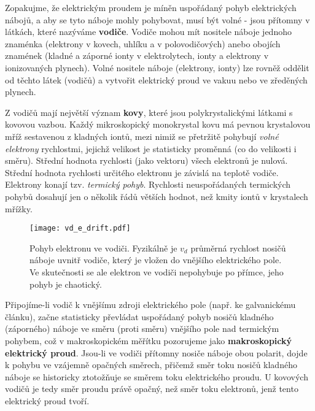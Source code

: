       Zopakujme, že elektrickým proudem je míněn uspořádaný pohyb elektrických ná\-bo\-jů, a aby se
      tyto náboje mohly pohybovat, musí být volné - jsou přítomny v látkách, které nazýváme
      \textbf{vodiče}. Vodiče mohou mít nositele náboje jednoho znaménka (elektrony v kovech,
      uhlíku a v polovodičových) anebo obojích znamének (kladné a záporné ionty v elektrolytech,
      ionty a elektrony v ionizovaných plynech). Volné nositele náboje (elektrony, ionty) lze
      rovněž oddělit od těchto látek (vodičů) a vytvořit elektrický proud ve vakuu nebo ve
      zředěných plynech.
      
      Z vodičů mají největší význam \textbf{kovy}, které jsou polykrystalickými látkami s kovovou
      vazbou. Každý mikroskopický monokrystal kovu má pevnou krystalovou mříž sestavenou z kladných
      iontů, mezi nimiž se přetržitě pohybují \emph{volné elektrony} rychlost\-mi, jejichž velikost
      je statisticky proměnná (co do velikosti i směru). Střední hodnota rychlosti (jako vektoru)
      všech elektronů je nulová. Střední hodnota rychlosti určitého elektronu je závislá na teplotě
      vodiče. Elektrony konají tzv. \emph{termický pohyb}. Rychlosti neuspořádaných termických
      pohybů dosahují jen o několik řádů větších hodnot, než kmity iontů v krystalech mřížky.

      \begin{figure}
        \centering
        \texttt{[image: vd\_e\_drift.pdf]}
        \caption[Pohyb elektronu ve vodiči.]{Pohyb elektronu ve vodiči. Fyzikálně je $v_d$ 
                 průměrná rychlost nosičů náboje uvnitř vodiče, který je vložen do vnějšího
                 elektrického pole. Ve skutečnosti se ale elektron ve vodiči nepohybuje po přímce,
                 jeho pohyb je chaotický.}
        \label{TEMP:fig_vd_e_drift}
      \end{figure}
      
      Připojíme-li vodič k vnějšímu zdroji elektrického pole (např. ke galvanickému článku), začne
      statisticky převládat uspořádaný pohyb nosičů kladného (záporného) náboje ve směru (proti
      směru) vnějšího pole nad termickým pohybem, což v makroskopickém měřít\-ku pozorujeme jako
      \textbf{makroskopický elektrický proud}. Jsou-li ve vodiči přítomny nosiče náboje obou
      polarit, dojde k pohybu ve vzájemně opačných směrech, přičemž směr toku nosičů kladného
      náboje se historicky ztotožňuje se směrem toku elektrického proudu. U kovových vodičů je tedy
      směr proudu právě opačný, než směr toku elektronů, jenž tento elektrický proud tvoří.
      
